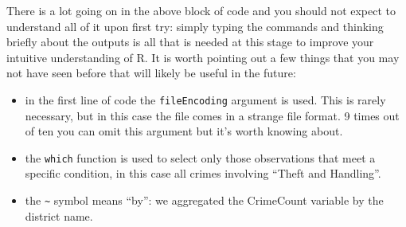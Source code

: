 \documentclass[]{article}
\newenvironment{Shaded}{}{}
\newcommand{\KeywordTok}[1]{\textcolor[rgb]{0.00,0.44,0.13}{\textbf{{#1}}}}
\newcommand{\DataTypeTok}[1]{\textcolor[rgb]{0.56,0.13,0.00}{{#1}}}
\newcommand{\DecValTok}[1]{\textcolor[rgb]{0.25,0.63,0.44}{{#1}}}
\newcommand{\StringTok}[1]{\textcolor[rgb]{0.25,0.44,0.63}{{#1}}}
\newcommand{\CommentTok}[1]{\textcolor[rgb]{0.38,0.63,0.69}{\textit{{#1}}}}
\newcommand{\NormalTok}[1]{{#1}}
\begin{document}
\begin{Shaded}
\end{Shaded}

There is a lot going on in the above block of code and you should not
expect to understand all of it upon first try: simply typing the
commands and thinking briefly about the outputs is all that is needed at
this stage to improve your intuitive understanding of R. It is worth
pointing out a few things that you may not have seen before that will
likely be useful in the future:

\begin{itemize}
\itemsep1pt\parskip0pt
\item
  in the first line of code the \texttt{fileEncoding} argument is used.
  This is rarely necessary, but in this case the file comes in a strange
  file format. 9 times out of ten you can omit this argument but it's
  worth knowing about.
\item
  the \texttt{which} function is used to select only those observations
  that meet a specific condition, in this case all crimes involving
  ``Theft and Handling''.
\item
  the \texttt{\textasciitilde{}} symbol means ``by'': we aggregated the
  CrimeCount variable by the district name.
\end{itemize}
\end{document}
